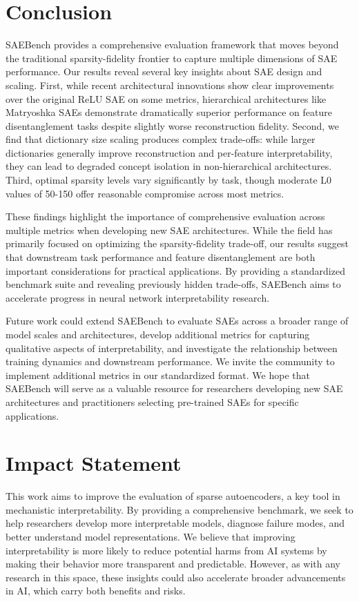 \documentclass{article}
\theoremstyle{plain}
\theoremstyle{definition}
\theoremstyle{remark}
\begin{document}
\section{Conclusion}
SAEBench provides a comprehensive evaluation framework that moves beyond the traditional sparsity-fidelity frontier to capture multiple dimensions of SAE performance. Our results reveal several key insights about SAE design and scaling. First, while recent architectural innovations show clear improvements over the original ReLU SAE on some metrics, hierarchical architectures like Matryoshka SAEs demonstrate dramatically superior performance on feature disentanglement tasks despite slightly worse reconstruction fidelity. Second, we find that dictionary size scaling produces complex trade-offs: while larger dictionaries generally improve reconstruction and per-feature interpretability, they can lead to degraded concept isolation in non-hierarchical architectures. Third, optimal sparsity levels vary significantly by task, though moderate L0 values of 50-150 offer reasonable compromise across most metrics.


These findings highlight the importance of comprehensive evaluation across multiple metrics when developing new SAE architectures. While the field has primarily focused on optimizing the sparsity-fidelity trade-off, our results suggest that downstream task performance and feature disentanglement are both important considerations for practical applications. By providing a standardized benchmark suite and revealing previously hidden trade-offs, SAEBench aims to accelerate progress in neural network interpretability research.

Future work could extend SAEBench to evaluate SAEs across a broader range of model scales and architectures, develop additional metrics for capturing qualitative aspects of interpretability, and investigate the relationship between training dynamics and downstream performance. We invite the community to implement additional metrics in our standardized format. We hope that SAEBench will serve as a valuable resource for researchers developing new SAE architectures and practitioners selecting pre-trained SAEs for specific applications.

\section*{Impact Statement}

This work aims to improve the evaluation of sparse autoencoders, a key tool in mechanistic interpretability. By providing a comprehensive benchmark, we seek to help researchers develop more interpretable models, diagnose failure modes, and better understand model representations. We believe that improving interpretability is more likely to reduce potential harms from AI systems by making their behavior more transparent and predictable. However, as with any research in this space, these insights could also accelerate broader advancements in AI, which carry both benefits and risks.
\end{document}
